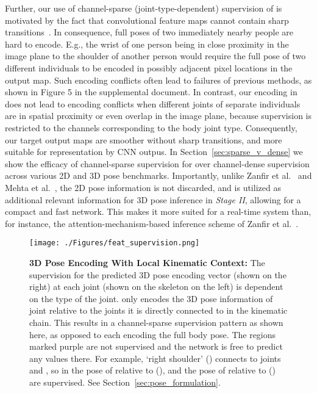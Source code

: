 \documentclass[acmtog,authorversion]{acmart}
\newcommand{\change}[1]{{{#1}}}
\newcommand{\etal}{et al.}
\begin{document}
Further, our use of channel-sparse (joint-type-dependent) supervision of  is motivated by the fact that convolutional feature maps cannot contain sharp transitions~\cite{mehta_3dv18}. In consequence, full poses of two immediately nearby people are hard to encode.
E.g., the wrist of one person being in close proximity in the image plane to the shoulder of another person would require the full pose of two different individuals to be encoded in possibly adjacent pixel locations in the output map. 
Such encoding conflicts often lead to failures of previous methods, as shown in Figure 5 in the supplemental document. In contrast, our encoding in  does not lead to encoding conflicts when different joints of separate individuals are in spatial proximity or even overlap in the image plane, because supervision is restricted to the channels corresponding to the body joint type. 
Consequently, our target output maps are smoother without sharp transitions, and more suitable for representation by CNN outpus. 
In Section~\ref{sec:sparse_v_dense} we show the efficacy of channel-sparse supervision for  over channel-dense supervision across various 2D and 3D pose benchmarks.
Importantly, unlike Zanfir \etal~ and Mehta \etal~, the 2D pose information is not discarded, and is utilized as additional relevant information for 3D pose inference in \textit{Stage II}, allowing for a compact and fast network. 
This makes it more suited for a real-time system than, for instance, the attention-mechanism-based inference scheme of Zanfir \etal~.

\begin{figure}[]
  \texttt{[image: ./Figures/feat\_supervision.png]}
  \caption
  {\textbf{3D Pose Encoding With Local Kinematic Context:} The supervision for the  predicted 3D pose encoding vector  \change{(shown on the right)} at each joint  \change{(shown on the skeleton on the left)} is dependent on the type of the joint.  only encodes the 3D pose information of joint  relative to the joints it is directly connected to in the kinematic chain. This results in a channel-sparse supervision pattern as shown here, as opposed to each  encoding the full body pose. The regions marked purple are not supervised and the network is free to predict any values there. \change{For example, `right shoulder' () connects to joints  and , so in  the pose of  relative to  (), and the pose of  relative to  () are supervised.} See Section~\ref{sec:pose_formulation}.}\label{fig:feat_supervision}
\end{figure}
\end{document}
